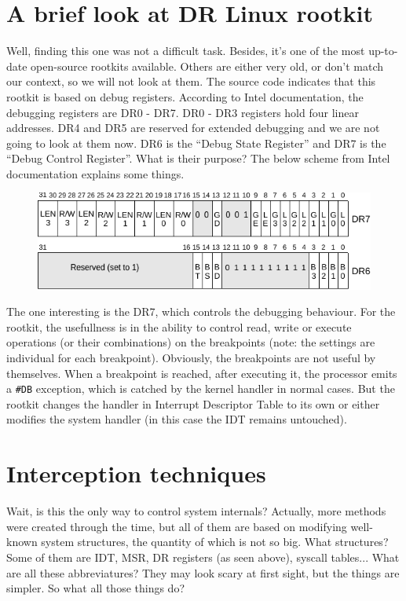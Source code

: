 \documentclass[12pt]{article}
\begin{document}
  \section{A brief look at DR Linux rootkit}
  
  Well, finding this one was not a difficult task. Besides, it's one of the
  most up-to-date open-source rootkits available. Others are either very old,
  or don't match our context, so we will not look at them. The source code
  indicates that this rootkit is based on debug registers. According to Intel
  documentation, the debugging registers are DR0 - DR7. DR0 - DR3 registers
  hold four linear addresses. DR4 and DR5 are reserved for extended debugging
  and we are not going to look at them now. DR6 is the ``Debug State
  Register'' and DR7 is the ``Debug Control Register''. What is their purpose?
  The below scheme from Intel documentation explains some things.
  \begin{figure}[h]
    \includegraphics[width=\linewidth, keepaspectratio]{dregs}
  \end{figure}
  The one interesting is the DR7, which controls the debugging behaviour. For
  the rootkit, the usefullness is in the ability to control read, write or
  execute operations (or their combinations) on the breakpoints (note: the
  settings are individual for each breakpoint). Obviously, the breakpoints are
  not useful by themselves. When a breakpoint is reached, after executing it,
  the processor emits a \verb!#DB! exception, which is catched by the kernel
  handler in normal cases. But the rootkit changes the handler in Interrupt
  Descriptor Table to its own or either modifies the system handler (in this
  case the IDT remains untouched).

  \section{Interception techniques}

  Wait, is this the only way to control system internals? Actually, more
  methods were created through the time, but all of them are based on
  modifying well-known system structures, the quantity of which is not so
  big. What structures? Some of them are IDT, MSR, DR registers (as seen
  above), syscall tables... What are all these abbreviatures? They may look
  scary at first sight, but the things are simpler. So what all those things
  do?
\end{document}
